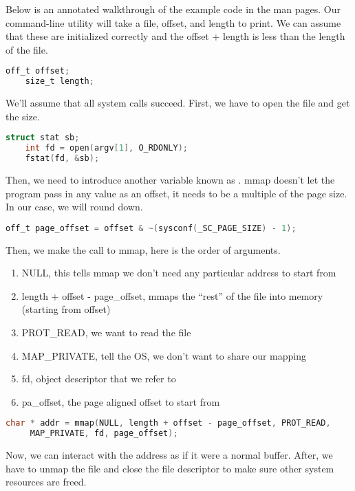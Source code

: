 	Below is an annotated walkthrough of the example code in the man pages.
	Our command-line utility will take a file, offset, and length to print.
	We can assume that these are initialized correctly and the offset + length is less than the length of the file.
	 
	\begin{lstlisting}[language=C]
	off_t offset;
	size_t length;
	\end{lstlisting}
	 
	We'll assume that all system calls succeed.
	First, we have to open the file and get the size.
	 
	\begin{lstlisting}[language=C]
	struct stat sb;
	int fd = open(argv[1], O_RDONLY);
	fstat(fd, &sb);
	\end{lstlisting}
	 
	Then, we need to introduce another variable known as .
	mmap doesn't let the program pass in any value as an offset, it needs to be a multiple of the page size.
	In our case, we will round down.
	 
	\begin{lstlisting}[language=C]
	off_t page_offset = offset & ~(sysconf(_SC_PAGE_SIZE) - 1);
	\end{lstlisting}
	 
	Then, we make the call to mmap, here is the order of arguments.
	\begin{enumerate}
	\item NULL, this tells mmap we don't need any particular address to start from
	\item length + offset - page\_offset, mmaps the ``rest'' of the file into memory (starting from offset)
	\item PROT\_READ, we want to read the file
	\item MAP\_PRIVATE, tell the OS, we don't want to share our mapping
	\item fd, object descriptor that we refer to
	\item pa\_offset, the page aligned offset to start from
	\end{enumerate}
	 
	\begin{lstlisting}[language=C]
	char * addr = mmap(NULL, length + offset - page_offset, PROT_READ,
	 MAP_PRIVATE, fd, page_offset);
	\end{lstlisting}
	 
	Now, we can interact with the address as if it were a normal buffer.
	After, we have to unmap the file and close the file descriptor to make sure other system resources are freed.
	 
